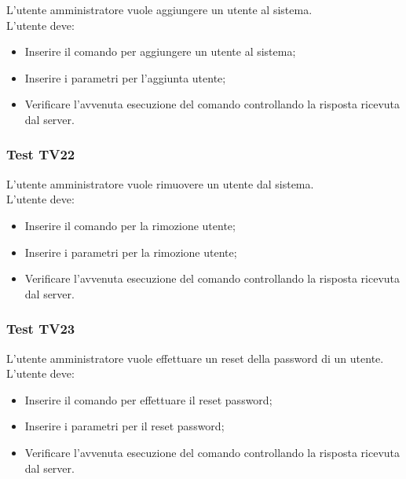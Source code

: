 \documentclass{scalatekids-article}
\begin{document}
L'utente amministratore vuole aggiungere un utente al sistema.\\
L'utente deve:
\begin{itemize}
\item Inserire il comando per aggiungere un utente al sistema;
\item Inserire i parametri per l'aggiunta utente;
\item Verificare l'avvenuta esecuzione del comando controllando la risposta ricevuta dal server.
\end{itemize}

\subsubsection{Test TV22}

L'utente amministratore vuole rimuovere un utente dal sistema.\\
L'utente deve:
\begin{itemize}
\item Inserire il comando per la rimozione utente;
\item Inserire i parametri per la rimozione utente;
\item Verificare l'avvenuta esecuzione del comando controllando la risposta ricevuta dal server.
\end{itemize}

\subsubsection{Test TV23}

L'utente amministratore vuole effettuare un reset della password di un utente.\\
L'utente deve:
\begin{itemize}
\item Inserire il comando per effettuare il reset password;
\item Inserire i parametri per il reset password;
\item Verificare l'avvenuta esecuzione del comando controllando la risposta ricevuta dal server.
\end{itemize}

\listoffigures
\end{document}

